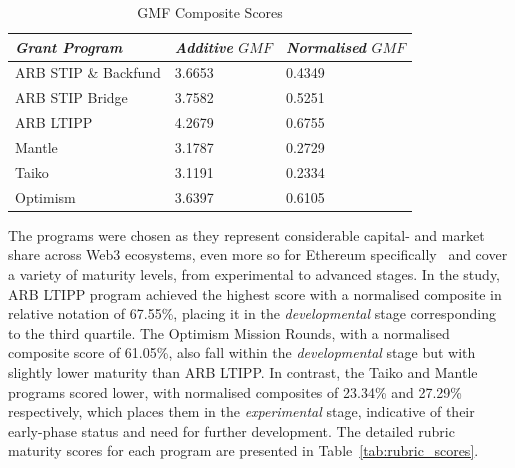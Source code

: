 \documentclass[conference]{IEEEtran}
\begin{document}
\begin{table}[htbp]
\caption{GMF Composite Scores}
\centering
\footnotesize
\begin{tabular}{p{2.7cm}p{2cm}p{2.3cm}}
\hline
\textbf{\textit{Grant Program}} & \textbf{\textit{Additive} \( GMF\)} & \textbf{\textit{Normalised} \( GMF \)} \\
\hline
ARB STIP \& Backfund & 3.6653 & 0.4349 \\
ARB STIP Bridge & 3.7582 & 0.5251 \\
ARB LTIPP & 4.2679 & 0.6755 \\
Mantle & 3.1787 & 0.2729 \\
Taiko & 3.1191 & 0.2334 \\
Optimism & 3.6397 & 0.6105 \\
\hline
\end{tabular}
\label{tab:gmf_composite_score}
\end{table}

The programs were chosen as they represent considerable capital- and market share across Web3 ecosystems, even more so for Ethereum specifically~\cite{marz_airdrops_2024} and cover a variety of maturity levels, from experimental to advanced stages. In the study, ARB LTIPP program achieved the highest score with a normalised composite in relative notation of 67.55\%, placing it in the \textit{developmental} stage corresponding to the third quartile. The Optimism Mission Rounds, with a normalised composite score of 61.05\%, also fall within the \textit{developmental} stage but with slightly lower maturity than ARB LTIPP. In contrast, the Taiko and Mantle programs scored lower, with normalised composites of 23.34\% and 27.29\% respectively, which places them in the \textit{experimental} stage, indicative of their early-phase status and need for further development. The detailed rubric maturity scores for each program are presented in Table~\ref{tab:rubric_scores}.
\end{document}
